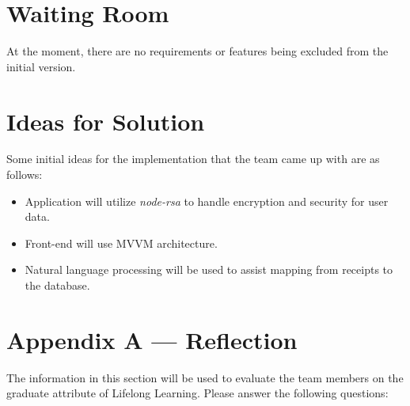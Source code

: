 \documentclass[12pt]{article}
\begin{document}
\section{Waiting Room}
At the moment, there are no requirements or features being excluded from the initial version.

\section{Ideas for Solution}
Some initial ideas for the implementation that the team came up with are as follows:
\begin{itemize}
    \item Application will utilize \textit{node-rsa} to handle encryption and security for user data.
    \item Front-end will use MVVM architecture.
    \item Natural language processing will be used to assist mapping from receipts to the database.
\end{itemize}

\newpage{}
\section*{Appendix A --- Reflection}

The information in this section will be used to evaluate the team members on the
graduate attribute of Lifelong Learning.  Please answer the following questions:
\end{document}
